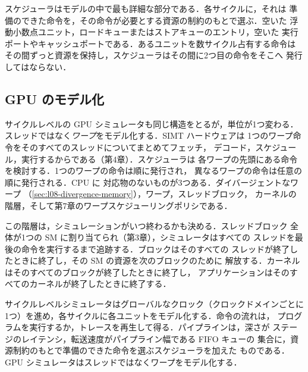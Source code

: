 \documentclass[../main.tex]{subfiles}
\begin{document}
スケジューラはモデルの中で最も詳細な部分である．各サイクルに，それは
準備のできた命令を，その命令が必要とする資源の制約のもとで選ぶ．空いた
浮動小数点ユニット，ロードキューまたはストアキューのエントリ，空いた
実行ポートやキャッシュポートである．あるユニットを数サイクル占有する命令は
その間ずっと資源を保持し，スケジューラはその間に2つ目の命令をそこへ
発行してはならない．

\subsection{GPU のモデル化}

サイクルレベルの GPU シミュレータも同じ構造をとるが，単位が1つ変わる．
スレッドではなく\emph{ワープ}をモデル化する．SIMT ハードウェアは
1つのワープ命令をそのすべてのスレッドについてまとめてフェッチ，
デコード，スケジュール，実行するからである（第4章）．スケジューラは
各ワープの先頭にある命令を検討する．1つのワープの命令は順に発行され，
異なるワープの命令は任意の順に発行される．CPU に
対応物のないものが3つある．ダイバージェントなワープ
（\cref{sec:l08-divergence-memory}），ワープ，スレッドブロック，
カーネルの階層，そして第7章のワープスケジューリングポリシである．

この階層は，シミュレーションがいつ終わるかも決める．スレッドブロック
全体が1つの SM に割り当てられ（第3章），シミュレータはすべての
スレッドを最後の命令を実行するまで追跡する．ブロックはそのすべての
スレッドが終了したときに終了し，その SM の資源を次のブロックのために
解放する．カーネルはそのすべてのブロックが終了したときに終了し，
アプリケーションはそのすべてのカーネルが終了したときに終了する．

\begin{keypoint}
  サイクルレベルシミュレータはグローバルなクロック（クロックドメインごとに
  1つ）を進め，各サイクルに各ユニットをモデル化する．命令の流れは，
  プログラムを実行するか，トレースを再生して得る．パイプラインは，深さが
  ステージのレイテンシ，転送速度がパイプライン幅である FIFO キューの
  集合に，資源制約のもとで準備のできた命令を選ぶスケジューラを加えた
  ものである．GPU シミュレータはスレッドではなくワープをモデル化する．
\end{keypoint}
\end{document}
